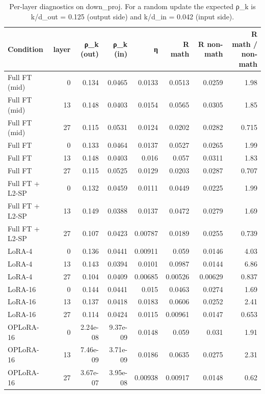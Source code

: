 \begin{table}[t]
\centering\small
\begin{tabular}{lrrrrrrr}
\toprule
Condition & layer & ρ\_k (out) & ρ\_k (in) & η & R math & R non-math & R math / non-math \\
\midrule
Full FT (mid) & 0 & 0.134 & 0.0465 & 0.0133 & 0.0513 & 0.0259 & 1.98 \\
Full FT (mid) & 13 & 0.148 & 0.0403 & 0.0154 & 0.0565 & 0.0305 & 1.85 \\
Full FT (mid) & 27 & 0.115 & 0.0531 & 0.0124 & 0.0202 & 0.0282 & 0.715 \\
Full FT & 0 & 0.133 & 0.0464 & 0.0137 & 0.0527 & 0.0265 & 1.99 \\
Full FT & 13 & 0.148 & 0.0403 & 0.016 & 0.057 & 0.0311 & 1.83 \\
Full FT & 27 & 0.115 & 0.0525 & 0.0129 & 0.0203 & 0.0287 & 0.707 \\
Full FT + L2-SP & 0 & 0.132 & 0.0459 & 0.0111 & 0.0449 & 0.0225 & 1.99 \\
Full FT + L2-SP & 13 & 0.149 & 0.0388 & 0.0137 & 0.0472 & 0.0279 & 1.69 \\
Full FT + L2-SP & 27 & 0.107 & 0.0423 & 0.00787 & 0.0189 & 0.0255 & 0.739 \\
LoRA-4 & 0 & 0.136 & 0.0441 & 0.00911 & 0.059 & 0.0146 & 4.03 \\
LoRA-4 & 13 & 0.143 & 0.0394 & 0.0101 & 0.0987 & 0.0144 & 6.86 \\
LoRA-4 & 27 & 0.104 & 0.0409 & 0.00685 & 0.00526 & 0.00629 & 0.837 \\
LoRA-16 & 0 & 0.144 & 0.0441 & 0.015 & 0.0463 & 0.0274 & 1.69 \\
LoRA-16 & 13 & 0.137 & 0.0418 & 0.0183 & 0.0606 & 0.0252 & 2.41 \\
LoRA-16 & 27 & 0.114 & 0.0424 & 0.0115 & 0.00961 & 0.0147 & 0.653 \\
OPLoRA-16 & 0 & 2.24e-08 & 9.37e-09 & 0.0148 & 0.059 & 0.031 & 1.91 \\
OPLoRA-16 & 13 & 7.46e-09 & 3.71e-09 & 0.0186 & 0.0635 & 0.0275 & 2.31 \\
OPLoRA-16 & 27 & 3.67e-07 & 3.95e-08 & 0.00938 & 0.00917 & 0.0148 & 0.62 \\
\bottomrule
\end{tabular}
\caption{Per-layer diagnostics on down\_proj. For a random update the expected ρ\_k is k/d\_out = 0.125 (output side) and k/d\_in = 0.042 (input side).}
\label{tab:task1_diagnostics_by_layer}
\end{table}
